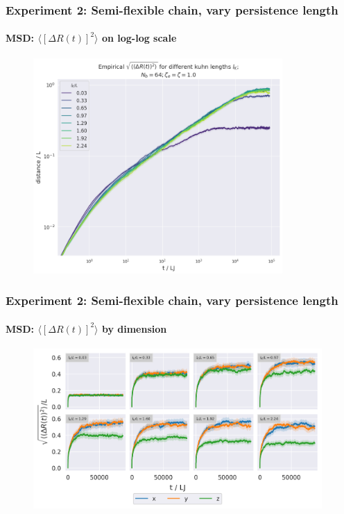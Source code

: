 \documentclass[handout]{beamer}
\newcommand{\mean}[1]{\langle #1 \rangle}
\begin{document}
\begin{frame}
    \frametitle{Experiment 2: Semi-flexible chain, vary persistence length}
    \framesubtitle{MSD: $\mean{[\Delta R(t)]^2}$ on log-log scale}

    \begin{figure}[h]
        \includegraphics[width=9.5cm]{./4-exp-msd-log.png}
    \end{figure}
\end{frame}

\begin{frame}
    \frametitle{Experiment 2: Semi-flexible chain, vary persistence length}
    \framesubtitle{MSD: $\mean{[\Delta R(t)]^2}$ by dimension}

    \begin{figure}[h]
        \includegraphics[width=11cm]{./4-exp-msd_by_dim.png}
    \end{figure}
\end{frame}
\end{document}
